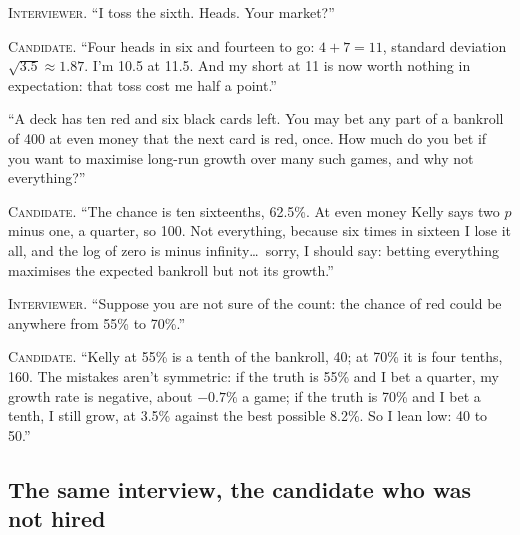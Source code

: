 \noindent\textsc{Interviewer.} ``I toss the sixth. Heads. Your market?''

\noindent\textsc{Candidate.} ``Four heads in six and fourteen to go: $4 + 7 = 11$, standard deviation $\sqrt{3.5} \approx 1.87$. I'm
10.5 at 11.5. And my short at 11 is now worth nothing in expectation: that toss cost me half a point.''


\begin{interviewq}\label{iq:iv:mock-interviews:3}
``A deck has ten red and six black cards left. You may bet any part of a bankroll of 400 at even money that the next card is red,
once. How much do you bet if you want to maximise long-run growth over many such games, and why not everything?''
\end{interviewq}

\noindent\textsc{Candidate.} ``The chance is ten sixteenths, 62.5\%. At even money Kelly says two $p$ minus one, a quarter, so 100.
Not everything, because six times in sixteen I lose it all, and the log of zero is minus infinity\ldots\ sorry, I should say: betting
everything maximises the expected bankroll but not its growth.''


\noindent\textsc{Interviewer.} ``Suppose you are not sure of the count: the chance of red could be anywhere from 55\% to 70\%.''

\noindent\textsc{Candidate.} ``Kelly at 55\% is a tenth of the bankroll, 40; at 70\% it is four tenths, 160. The mistakes aren't
symmetric: if the truth is 55\% and I bet a quarter, my growth rate is negative, about $-0.7\%$ a game; if the truth is 70\% and I bet a
tenth, I still grow, at 3.5\% against the best possible 8.2\%. So I lean low: 40 to 50.''


\subsection*{The same interview, the candidate who was not hired}

